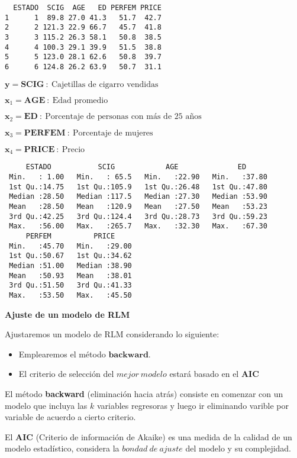 \documentclass[
  a4paper,
  oneside,
  openany]{book}
\begin{document}
\begin{verbatim}
  ESTADO  SCIG  AGE   ED PERFEM PRICE
1      1  89.8 27.0 41.3   51.7  42.7
2      2 121.3 22.9 66.7   45.7  41.8
3      3 115.2 26.3 58.1   50.8  38.5
4      4 100.3 29.1 39.9   51.5  38.8
5      5 123.0 28.1 62.6   50.8  39.7
6      6 124.8 26.2 63.9   50.7  31.1
\end{verbatim}

\(\textbf{y}=\textbf{SCIG} \ : \ \mbox{Cajetillas de cigarro vendidas}\)

\(\textbf{x}_1=\textbf{AGE} \ : \ \mbox{Edad promedio}\)

\(\textbf{x}_2=\textbf{ED} \ : \ \mbox{Porcentaje de personas con más de 25 años}\)

\(\textbf{x}_3=\textbf{PERFEM} \ : \ \mbox{Porcentaje de mujeres}\)

\(\textbf{x}_4=\textbf{PRICE} \ : \ \mbox{Precio}\)

\begin{verbatim}
     ESTADO           SCIG            AGE              ED       
 Min.   : 1.00   Min.   : 65.5   Min.   :22.90   Min.   :37.80  
 1st Qu.:14.75   1st Qu.:105.9   1st Qu.:26.48   1st Qu.:47.80  
 Median :28.50   Median :117.5   Median :27.30   Median :53.90  
 Mean   :28.50   Mean   :120.9   Mean   :27.50   Mean   :53.23  
 3rd Qu.:42.25   3rd Qu.:124.4   3rd Qu.:28.73   3rd Qu.:59.23  
 Max.   :56.00   Max.   :265.7   Max.   :32.30   Max.   :67.30  
     PERFEM          PRICE      
 Min.   :45.70   Min.   :29.00  
 1st Qu.:50.67   1st Qu.:34.62  
 Median :51.00   Median :38.90  
 Mean   :50.93   Mean   :38.01  
 3rd Qu.:51.50   3rd Qu.:41.33  
 Max.   :53.50   Max.   :45.50  
\end{verbatim}

\textbf{Ajuste de un modelo de RLM}

Ajustaremos un modelo de RLM considerando lo siguiente:

\begin{itemize}
\item
  Emplearemos el método \(\textbf{backward}.\)
\item
  El criterio de selección del \(mejor \ modelo\) estará basado en el \(\textbf{AIC}\)
\end{itemize}

El método \textbf{backward} (eliminación hacia atrás) consiste en comenzar con un modelo que incluya las \(k\) variables regresoras y luego ir eliminando varible por variable de acuerdo a cierto criterio.

El \textbf{AIC} (Criterio de información de Akaike) es una medida de la calidad de un modelo estadístico, considera la \(bondad \ de \ ajuste\) del modelo y su complejidad.
\end{document}
